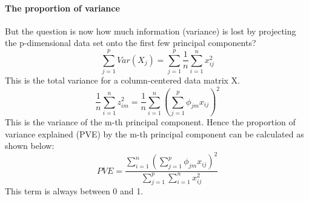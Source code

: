 \documentclass[../document.tex]{subfiles}
\begin{document}
	\paragraph{The proportion of variance}
	But the question is now how much information (variance) is lost by projecting the p-dimensional data set onto the first few principal components?
	\begin{equation}
		\sum_{j=1}^{p}Var(X_{j})=\sum_{j=1}^{p}\frac{1}{n}\sum_{i=1}^{n}x_{ij}^2
	\end{equation}
	This is the total variance for a column-centered data matrix X.
	\begin{equation}
		\frac{1}{n}\sum_{i=1}^{n}z_{im}^2=\frac{1}{n}\sum_{i=1}^{n}(\sum_{j=1}^{p}\phi_{jm}x_{ij})^2
	\end{equation}
	This is the variance of the m-th principal component. Hence the proportion of variance explained (PVE) by the m-th principal component can be calculated as shown below:
	\begin{equation}
		PVE=\frac{\sum_{i=1}^{n}(\sum_{j=1}^{p}\phi_{jm}x_{ij})^2}{\sum_{j=1}^{p}\sum_{i=1}^{n}x_{ij}^2}
	\end{equation}
	This term is always between 0 and 1.
\end{document}
